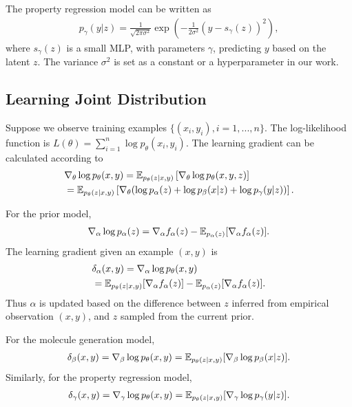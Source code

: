 \documentclass[accepted]{uai2023} %
\begin{document}
The property regression model can be written as
\begin{align}
   p_{\gamma}(y|z) = \frac{1}{\sqrt{2 \pi \sigma^2}} \exp\left( - \frac{1}{2\sigma^2} (y - s_\gamma(z) )^2\right), 
\end{align}
where $s_\gamma(z)$ is a small MLP, with parameters $\gamma$, predicting $y$ based on the latent $z$. The variance $\sigma^2$ is set as a constant or a hyperparameter in our work. 

\subsection{Learning Joint Distribution}
\label{sec: learning}

Suppose we observe training examples $\{(x_i, y_i), i = 1, ..., n\}$. The log-likelihood function is $L( \theta) = \sum_{i=1}^{n} \log p_\theta(x_i, y_i)$.
The learning gradient can be calculated according to 
\begin{align} 
   &\nabla_\theta  \log p_\theta(x, y)  = \mathbb{E}_{p_\theta(z|x, y)} \left[ \nabla_\theta \log p_\theta(x, y, z) \right] \nonumber\\
     &= \mathbb{E}_{p_\theta(z|x, y)} \left[ \nabla_\theta (\log p_\alpha(z) + \log p_\beta(x|z) + \log p_\gamma(y|z)) \right].
\end{align}

For the prior model, 
\begin{align}
    \nabla_\alpha \log p_\alpha(z)  =  \nabla_\alpha f_\alpha(z) - \mathbb{E}_{p_\alpha(z)}[ \nabla_\alpha f_\alpha(z)]. 
\end{align}
The learning gradient given an example $(x, y)$ is
\begin{align} 
  &\delta_\alpha(x, y) =   \nabla_\alpha \log p_\theta(x, y) \nonumber\\&= \mathbb{E}_{p_\theta(z|x, y)}[\nabla_\alpha f_\alpha(z)] - \mathbb{E}_{p_\alpha(z)} [\nabla_\alpha f_\alpha(z)]. \label{eq:alpha}
\end{align}
Thus $\alpha$ is updated based on the difference between $z$ inferred from empirical observation $(x, y)$, and $z$ sampled from the current prior. 

For the molecule generation model,
\begin{align} 
\label{eq:beta}
\begin{split}
  \delta_\beta(x, y) =  \nabla_\beta \log p_\theta(x, y)  = \mathbb{E}_{p_\theta(z|x, y)} [\nabla_\beta \log p_{\beta}(x|z)].
\end{split}
\end{align} 
Similarly, for the property regression model, 
\begin{align} 
\label{eq:gamma}
\begin{split}
  \delta_\gamma(x, y) =  \nabla_\gamma \log p_\theta(x, y)  = \mathbb{E}_{p_\theta(z|x, y)} [\nabla_\gamma \log p_{\gamma}(y|z)].
\end{split}
\end{align} 
\end{document}
